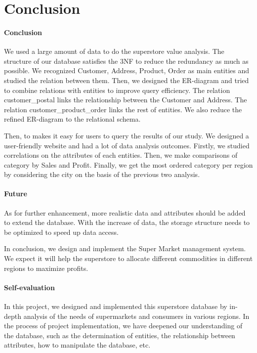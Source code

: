 \section{Conclusion}
\label{section:conclusion}
\paragraph{Conclusion}
	We used a large amount of data to do the superstore value analysis. The structure of our database satisfies the 3NF to reduce the redundancy as much as possible. We recognized Customer, Address, Product, Order as main entities and studied the relation between them. Then, we designed the ER-diagram and tried to combine relations with entities to improve query efficiency. The relation customer\_postal links the relationship between the Customer and Address. The relation customer\_product\_order links the rest of entities. We also reduce the refined ER-diagram to the relational schema.\par
	Then, to makes it easy for users to query the results of our study. We designed a user-friendly website and had a lot of data analysis outcomes. Firstly, we studied correlations on the attributes of each entities. Then, we make comparisons of category by Sales and Profit. Finally, we get the most ordered category per region by considering the city on the basis of the previous two analysis.\par
\paragraph{Future}
	As for further enhancement, more realistic data and attributes should be added to extend the database. With the increase of data, the storage structure needs to be optimized to speed up data access.\par
    In conclusion, we design and implement the Super Market management system. We expect it will help the superstore to allocate different commodities in different regions to maximize profits.\par
\paragraph{Self-evaluation}
	In this project, we designed and implemented this superstore database by in-depth analysis of the needs of supermarkets and consumers in various regions. In the process of project implementation, we have deepened our understanding of the database, such as the determination of entities, the relationship between attributes, how to manipulate the database, etc.
